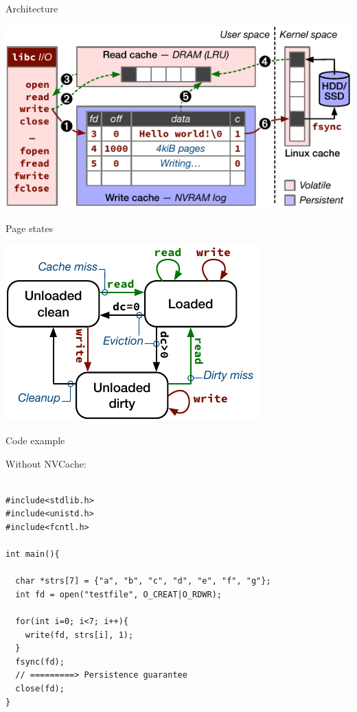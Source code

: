 \documentclass[presentation]{beamer}
\begin{document}
\begin{frame}[label={sec:org6e3e83e}]{Architecture}
\begin{block}{}
\begin{center}
\includegraphics[width=.9\linewidth]{./IMGs/nvcache-model.pdf}
\end{center}
\end{block}
\end{frame}



\begin{frame}[label={sec:org54af3d1}]{Page states}
\begin{center}
\includegraphics[width=.9\linewidth]{./IMGs/pagestates.pdf}
\end{center}
\end{frame}


\begin{frame}[label={sec:org65da4f0},fragile]{Code example}
 \begin{block}{Without NVCache:}
\fontsize{8pt}{10pt}\\
\begin{verbatim}

#include<stdlib.h>
#include<unistd.h>
#include<fcntl.h>

int main(){

  char *strs[7] = {"a", "b", "c", "d", "e", "f", "g"};
  int fd = open("testfile", O_CREAT|O_RDWR);

  for(int i=0; i<7; i++){
    write(fd, strs[i], 1);
  }
  fsync(fd);
  // =========> Persistence guarantee
  close(fd);
}

\end{verbatim}
\end{block}
\end{frame}
\end{document}
